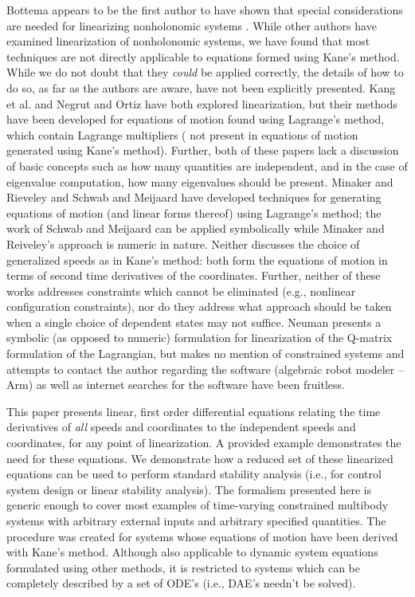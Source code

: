 \documentclass[smallcondensed,final]{svjour3}                     %
\begin{document}
Bottema appears to be the first author to have shown that special
considerations are needed for linearizing nonholonomic systems
\cite{Bottema1949}. While other authors have examined linearization of
nonholonomic systems, we have found that most techniques are not directly
applicable to equations formed using Kane's method. While we do not doubt that
they \textit{could} be applied correctly, the details of how to do so, as far
as the authors are aware, have not been explicitly presented. Kang et al.
\cite{Kang2003} and Negrut and Ortiz \cite{Negrut2006} have both explored
linearization, but their methods have been developed for equations of motion
found using Lagrange's method, which contain Lagrange multipliers ( not present
in equations of motion generated using Kane's method). Further, both of these
papers lack a discussion of basic concepts such as how many quantities are
independent, and in the case of eigenvalue computation, how many eigenvalues
should be present. Minaker and Rieveley \cite{Minaker2010} and Schwab and
Meijaard \cite{Schwab2003} have developed techniques for generating equations
of motion (and linear forms thereof) using Lagrange's method; the work of
Schwab and Meijaard can be applied symbolically while Minaker and Reiveley's
approach is numeric in nature. Neither discusses the choice of generalized
speeds as in Kane's method: both form the equations of motion in terms of
second time derivatives of the coordinates.  Further, neither of these works
addresses constraints which cannot be eliminated (e.g., nonlinear configuration
constraints), nor do they address what approach should be taken when a single
choice of dependent states may not suffice.  Neuman \cite{Neuman1984} presents
a symbolic (as opposed to numeric) formulation for linearization of the
Q-matrix formulation of the Lagrangian, but makes no mention of constrained
systems and attempts to contact the author regarding the software (algebraic
robot modeler -- Arm) as well as internet searches for the software have been
fruitless.


This paper presents linear, first order differential equations relating the
time derivatives of \textit{all} speeds and coordinates to the independent
speeds and coordinates, for any point of linearization.  A provided example
demonstrates the need for these equations.  We demonstrate how a reduced
set of these linearized equations can be used to perform standard stability
analysis (i.e., for control system design or linear stability analysis).  The
formalism presented here is generic enough to cover most examples of
time-varying constrained multibody systems with arbitrary external inputs and
arbitrary specified quantities.
The procedure was created for systems whose equations of motion have been
derived with Kane's method. Although also applicable to dynamic system
equations formulated using other methods, it is restricted to systems which can
be completely described by a set of ODE's (i.e., DAE's needn't be solved).
\end{document}
